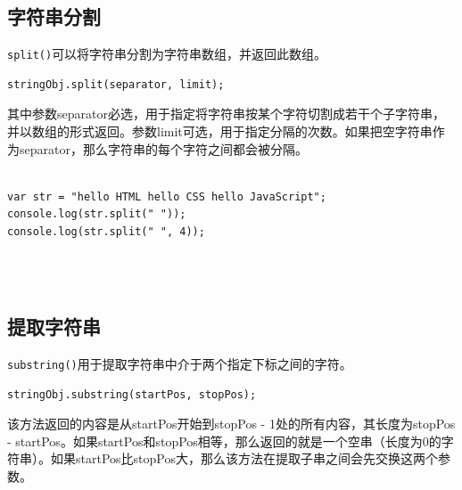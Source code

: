 \subsection{字符串分割}

\lstinline|split()|可以将字符串分割为字符串数组，并返回此数组。 \\

\begin{lstlisting}[style=htmlcssjs]
stringObj.split(separator, limit);
\end{lstlisting}

其中参数separator必选，用于指定将字符串按某个字符切割成若干个子字符串，并以数组的形式返回。参数limit可选，用于指定分隔的次数。如果把空字符串作为separator，那么字符串的每个字符之间都会被分隔。 \\

 \\

\begin{lstlisting}[style=htmlcssjs]
var str = "hello HTML hello CSS hello JavaScript";
console.log(str.split(" "));
console.log(str.split(" ", 4));
\end{lstlisting}

\begin{tcolorbox}
	 \\
	 \\
\end{tcolorbox}

\subsection{提取字符串}

\lstinline|substring()|用于提取字符串中介于两个指定下标之间的字符。 \\

\begin{lstlisting}[style=htmlcssjs]
stringObj.substring(startPos, stopPos);
\end{lstlisting}

该方法返回的内容是从startPos开始到stopPos - 1处的所有内容，其长度为stopPos - startPos。如果startPos和stopPos相等，那么返回的就是一个空串（长度为0的字符串）。如果startPos比stopPos大，那么该方法在提取子串之间会先交换这两个参数。 \\

 \\

